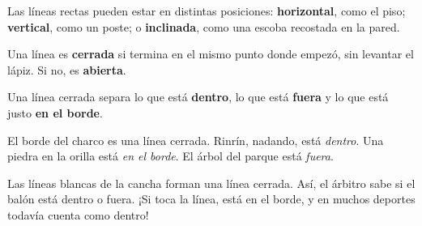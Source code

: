 \documentclass[11pt]{article}
\begin{document}
Las líneas rectas pueden estar en distintas posiciones:
\textbf{horizontal}, como el piso; \textbf{vertical}, como un poste; o
\textbf{inclinada}, como una escoba recostada en la pared.

\begin{center}
\end{center}

Una línea es \textbf{cerrada} si termina en el mismo punto donde empezó, sin
levantar el lápiz. Si no, es \textbf{abierta}.

\begin{center}
\end{center}

Una línea cerrada separa lo que está \textbf{dentro}, lo que está
\textbf{fuera} y lo que está justo \textbf{en el borde}.

\begin{ejemplo}
El borde del charco es una línea cerrada. Rinrín, nadando, está
\emph{dentro}. Una piedra en la orilla está \emph{en el borde}. El árbol del
parque está \emph{fuera}.
\end{ejemplo}

\begin{aplicacion}
Las líneas blancas de la cancha forman una línea cerrada. Así, el árbitro
sabe si el balón está dentro o fuera. ¡Si toca la línea, está en el borde,
y en muchos deportes todavía cuenta como dentro!
\end{aplicacion}
\end{document}
